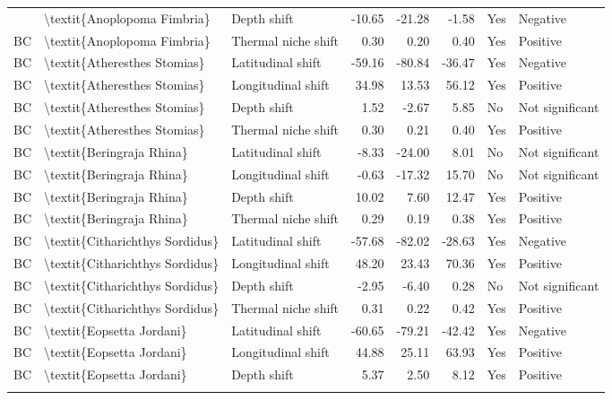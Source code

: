 \begin{longtable}[t]{lllrrrll}
{{BC & \textbackslash{}textit\{Anoplopoma Fimbria\} & Depth shift & -10.65 & -21.28 & -1.58 & Yes & Negative\\
\addlinespace
BC & \textbackslash{}textit\{Anoplopoma Fimbria\} & Thermal niche shift & 0.30 & 0.20 & 0.40 & Yes & Positive\\
BC & \textbackslash{}textit\{Atheresthes Stomias\} & Latitudinal shift & -59.16 & -80.84 & -36.47 & Yes & Negative\\
BC & \textbackslash{}textit\{Atheresthes Stomias\} & Longitudinal shift & 34.98 & 13.53 & 56.12 & Yes & Positive\\
BC & \textbackslash{}textit\{Atheresthes Stomias\} & Depth shift & 1.52 & -2.67 & 5.85 & No & Not significant\\
BC & \textbackslash{}textit\{Atheresthes Stomias\} & Thermal niche shift & 0.30 & 0.21 & 0.40 & Yes & Positive\\
\addlinespace
BC & \textbackslash{}textit\{Beringraja Rhina\} & Latitudinal shift & -8.33 & -24.00 & 8.01 & No & Not significant\\
BC & \textbackslash{}textit\{Beringraja Rhina\} & Longitudinal shift & -0.63 & -17.32 & 15.70 & No & Not significant\\
BC & \textbackslash{}textit\{Beringraja Rhina\} & Depth shift & 10.02 & 7.60 & 12.47 & Yes & Positive\\
BC & \textbackslash{}textit\{Beringraja Rhina\} & Thermal niche shift & 0.29 & 0.19 & 0.38 & Yes & Positive\\
BC & \textbackslash{}textit\{Citharichthys Sordidus\} & Latitudinal shift & -57.68 & -82.02 & -28.63 & Yes & Negative\\
\addlinespace
BC & \textbackslash{}textit\{Citharichthys Sordidus\} & Longitudinal shift & 48.20 & 23.43 & 70.36 & Yes & Positive\\
BC & \textbackslash{}textit\{Citharichthys Sordidus\} & Depth shift & -2.95 & -6.40 & 0.28 & No & Not significant\\
BC & \textbackslash{}textit\{Citharichthys Sordidus\} & Thermal niche shift & 0.31 & 0.22 & 0.42 & Yes & Positive\\
BC & \textbackslash{}textit\{Eopsetta Jordani\} & Latitudinal shift & -60.65 & -79.21 & -42.42 & Yes & Negative\\
BC & \textbackslash{}textit\{Eopsetta Jordani\} & Longitudinal shift & 44.88 & 25.11 & 63.93 & Yes & Positive\\
\addlinespace
BC & \textbackslash{}textit\{Eopsetta Jordani\} & Depth shift & 5.37 & 2.50 & 8.12 & Yes & Positive\\
}}
\end{longtable}
